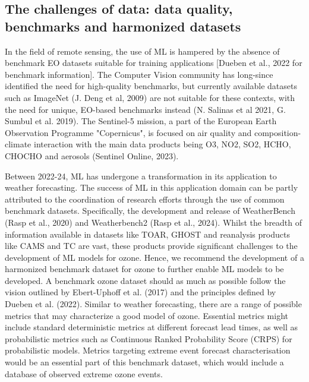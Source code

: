 \documentclass[gmd, manuscript]{copernicus}
\begin{document}
\subsection{The challenges of data: data quality, benchmarks and harmonized datasets}
In the field of remote sensing, the use of ML is hampered by the absence of benchmark EO datasets suitable for training applications [Dueben et al., 2022 for benchmark information].  The Computer Vision community has long-since identified the need for high-quality benchmarks, but currently available datasets such as ImageNet (J. Deng et al, 2009) are not suitable for these contexts, with the need for unique, EO-based benchmarks instead (N. Salinas et al 2021, G. Sumbul et al. 2019). The Sentinel-5 mission, a part of the European Earth Observation Programme "Copernicus", is focused on air quality and composition-climate interaction with the main data products being O3, NO2, SO2, HCHO, CHOCHO and aerosols (Sentinel Online, 2023).

Between 2022-24, ML has undergone a transformation in its application to weather forecasting. The success of ML in this application domain can be partly attributed to the coordination of research efforts through the use of common benchmark datasets. Specifically, the development and release of WeatherBench (Rasp et al., 2020) and Weatherbench2 (Rasp et al., 2024). Whilst the breadth of information available in datasets like TOAR, GHOST and reanalysis products like CAMS and TC are vast, these products provide significant challenges to the development of ML models for ozone. Hence, we recommend the development of a harmonized benchmark dataset for ozone to further enable ML models to be developed. A benchmark ozone dataset should as much as possible follow the vision outlined by Ebert-Uphoff et al. (2017) and the principles defined by Dueben et al. (2022). Similar to weather forecasting, there are a range of possible metrics that may characterize a good model of ozone. Essential metrics might include standard deterministic metrics at different forecast lead times, as well as probabilistic metrics such as Continuous Ranked Probability Score (CRPS) for probabilistic models. Metrics targeting extreme event forecast characterisation would be an essential part of this benchmark dataset, which would include a database of observed extreme ozone events.
\end{document}
